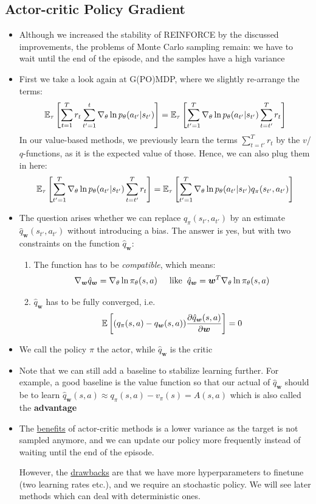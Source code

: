 \subsection{Actor-critic Policy Gradient}
\begin{itemize}
	\item Although we increased the stability of REINFORCE by the discussed improvements, the problems of Monte Carlo sampling remain: we have to wait until the end of the episode, and the samples have a high variance
	\item First we take a look again at G(PO)MDP, where we slightly re-arrange the terms:
	$$\mathbb{E}_{\tau}\left[\sum_{t=1}^{T}  r_t \sum_{t'=1}^{t}\nabla_{\theta} \ln p_{\theta}(a_{t'}|s_{t'}) \right] = \mathbb{E}_{\tau}\left[\sum_{t'=1}^{T}\nabla_{\theta} \ln p_{\theta}(a_{t'}|s_{t'}) \sum_{t=t'}^{T}  r_t\right]$$
	In our value-based methods, we previously learn the terms $\sum_{t=t'}^{T}  r_t$ by the $v$/$q$-functions, as it is the expected value of those. Hence, we can also plug them in here:
	$$\mathbb{E}_{\tau}\left[\sum_{t'=1}^{T}\nabla_{\theta} \ln p_{\theta}(a_{t'}|s_{t'}) \sum_{t=t'}^{T}  r_t\right] = \mathbb{E}_{\tau}\left[\sum_{t'=1}^{T}\nabla_{\theta} \ln p_{\theta}(a_{t'}|s_{t'}) q_{\pi}(s_{t'},a_{t'})\right]$$
	\item The question arises whether we can replace $q_{\pi}(s_{t'},a_{t'})$ by an estimate $\hat{q}_{\bm{w}}(s_{t'},a_{t'})$ without introducing a bias. The answer is yes, but with two constraints on the function $\hat{q}_{\bm{w}}$:
	\begin{enumerate}
		\item The function has to be \textit{compatible}, which means:
		$$\nabla_{\bm{w}}\hat{q}_{\bm{w}} = \nabla_{\theta}\ln \pi_{\theta}(s,a)\hspace{5mm}\text{like}\hspace{2mm} \hat{q}_{\bm{w}}=\bm{w}^T \nabla_{\theta} \ln \pi_{\theta}(s,a)$$
		\item $\hat{q}_{\bm{w}}$ has to be fully converged, i.e.
		$$\mathbb{E}\left[(q_{\pi}(s,a)-q_{\bm{w}}(s,a)) \frac{\partial \hat{q}_{\bm{w}}(s,a)}{\partial \bm{w}}\right]= 0$$
	\end{enumerate}
	\item We call the policy $\pi$ the actor, while $\hat{q}_{\bm{w}}$ is the critic
	\item Note that we can still add a baseline to stabilize learning further. For example, a good baseline is the value function so that our actual of $\hat{q}_{\bm{w}}$ should be to learn $\hat{q}_{\bm{w}}(s,a)\approx q_{\pi}(s,a)-v_{\pi}(s)=A(s,a)$ which is also called the \textbf{advantage}
	\item The \underline{benefits} of actor-critic methods is a lower variance as the target is not sampled anymore, and we can update our policy more frequently instead of waiting until the end of the episode.
	
	However, the \underline{drawbacks} are that we have more hyperparameters to finetune (two learning rates etc.), and we require an stochastic policy. We will see later methods which can deal with deterministic ones.
\end{itemize}
